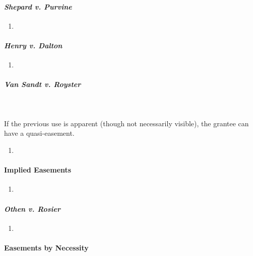 \paragraph{\emph{Shepard v. Purvine}}

\begin{enumerate}
    \item %
\end{enumerate}

\paragraph{\emph{Henry v. Dalton}}

\begin{enumerate}
    \item %
\end{enumerate}

\paragraph{\emph{Van Sandt v. Royster}}
~\\\\
If the previous use is apparent (though not necessarily visible), the grantee 
can have a quasi-easement.

\begin{enumerate}
    \item %
\end{enumerate}

\paragraph{Implied Easements}

\begin{enumerate}
    \item %
\end{enumerate}

\paragraph{\emph{Othen v. Rosier}}

\begin{enumerate}
    \item %
\end{enumerate}

\paragraph{Easements by Necessity}

